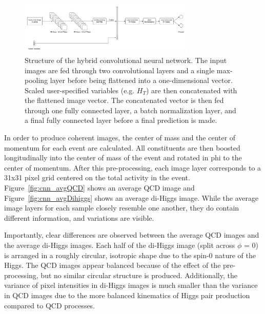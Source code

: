 \begin{figure}[!h] 
\begin{center}
\includegraphics*[width=0.75\textwidth] {CNN/figures/hybridCNN.png}
\caption{Structure of the hybrid convolutional neural network. The input images are fed through two convolutional layers and a single max-pooling layer before being flattened into a one-dimensional vector. Scaled user-specified variables (e.g. $H_{T}$) are then concatenated with the flattened image vector. The concatenated vector is then fed through one fully connected layer, a batch normalization layer, and a final fully connected layer before a final prediction is made.}
  \label{fig:cnn_hybrid}
\end{center}
\end{figure}

In order to produce coherent images, the center of mass and the center of momentum for each event are calculated. All constituents are then boosted longitudinally into the center of mass of the event and rotated in phi to the center of momentum. After this pre-processing, each image layer corresponds to a 31x31 pixel grid centered on the total activity in the event. Figure~\ref{fig:cnn_avgQCD} shows an average QCD image and Figure~\ref{fig:cnn_avgDihiggs} shows an average di-Higgs image. While the average image layers for each sample closely resemble one another, they do contain different information, and variations are visible.

Importantly, clear differences are observed between the average QCD images and the average di-Higgs images. Each half of the di-Higgs image (split across $\phi$ = 0) is arranged in a roughly circular, isotropic shape due to the spin-0 nature of the Higgs. The QCD images appear balanced because of the effect of the pre-processing, but no similar circular structure is produced. Additionally, the variance of pixel intensities in di-Higgs images is much smaller than the variance in QCD images due to the more balanced kinematics of Higgs pair production compared to QCD processes.

